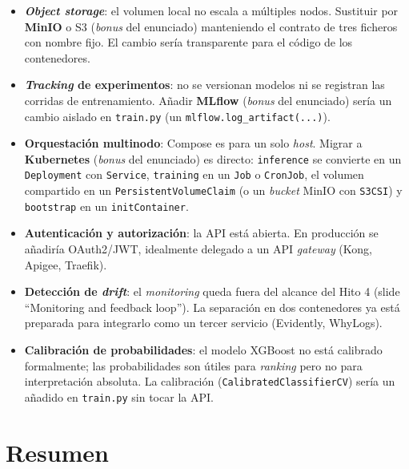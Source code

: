 \documentclass[12pt,a4paper]{report}
\begin{document}
\begin{itemize}
    \item \textbf{\textit{Object storage}}: el volumen local no escala a múltiples nodos. Sustituir por \textbf{MinIO} o S3 (\textit{bonus} del enunciado) manteniendo el contrato de tres ficheros con nombre fijo. El cambio sería transparente para el código de los contenedores.
    \item \textbf{\textit{Tracking} de experimentos}: no se versionan modelos ni se registran las corridas de entrenamiento. Añadir \textbf{MLflow} (\textit{bonus} del enunciado) sería un cambio aislado en \texttt{train.py} (un \texttt{mlflow.log\_artifact(...)}).
    \item \textbf{Orquestación multinodo}: Compose es para un solo \textit{host}. Migrar a \textbf{Kubernetes} (\textit{bonus} del enunciado) es directo: \texttt{inference} se convierte en un \texttt{Deployment} con \texttt{Service}, \texttt{training} en un \texttt{Job} o \texttt{CronJob}, el volumen compartido en un \texttt{PersistentVolumeClaim} (o un \textit{bucket} MinIO con \texttt{S3CSI}) y \texttt{bootstrap} en un \texttt{initContainer}.
    \item \textbf{Autenticación y autorización}: la API está abierta. En producción se añadiría OAuth2/JWT, idealmente delegado a un API \textit{gateway} (Kong, Apigee, Traefik).
    \item \textbf{Detección de \textit{drift}}: el \textit{monitoring} queda fuera del alcance del Hito 4 (slide ``Monitoring and feedback loop''). La separación en dos contenedores ya está preparada para integrarlo como un tercer servicio (Evidently, WhyLogs).
    \item \textbf{Calibración de probabilidades}: el modelo XGBoost no está calibrado formalmente; las probabilidades son útiles para \textit{ranking} pero no para interpretación absoluta. La calibración (\texttt{CalibratedClassifierCV}) sería un añadido en \texttt{train.py} sin tocar la API.
\end{itemize}

\section{Resumen}
\label{sec:hito4-resumen}
\end{document}
